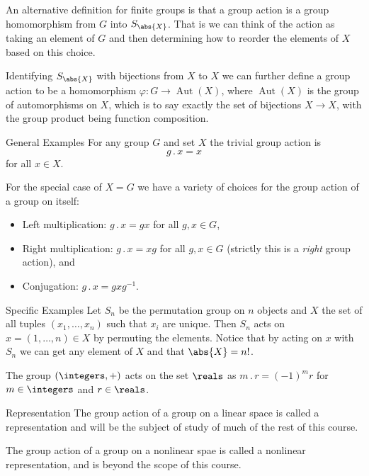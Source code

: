 \documentclass[fleqn]{NotesClass}
\newcommand*{\action}{\mathbin{.}}
\DeclareMathOperator{\Aut}{Aut}
\begin{document}
    An alternative definition for finite groups is that a group action is a group homomorphism from \(G\) into \(S_{\abs{X}}\).
    That is we can think of the action as taking an element of \(G\) and then determining how to reorder the elements of \(X\) based on this choice.
    
    Identifying \(S_{\abs{X}}\) with bijections from \(X\) to \(X\) we can further define a group action to be a homomorphism \(\varphi \colon G \to \Aut(X)\), where \(\Aut(X)\) is the group of automorphisms on \(X\), which is to say exactly the set of bijections \(X \to X\), with the group product being function composition.
    
    \begin{exm}{General Examples}{}
        For any group \(G\) and set \(X\) the trivial group action is
        \begin{equation}
            g\action x = x
        \end{equation}
        for all \(x \in X\).
        
        For the special case of \(X = G\) we have a variety of choices for the group action of a group on itself:
        \begin{itemize}
            \item Left multiplication: \(g\action x = gx\) for all \(g, x \in G\),
            \item Right multiplication: \(g\action x = xg\) for all \(g, x \in G\) (strictly this is a \emph{right} group action), and
            \item Conjugation: \(g\action x = gxg^{-1}\).
        \end{itemize}
    \end{exm}

    \begin{exm}{Specific Examples}{}
        Let \(S_n\) be the permutation group on \(n\) objects and \(X\) the set of all tuples \((x_1, \dotsc, x_n)\) such that \(x_i\) are unique.
        Then \(S_n\) acts on \(x = (1, \dotsc, n)\in X\) by permuting the elements.
        Notice that by acting on \(x\) with \(S_n\) we can get any element of \(X\) and that \(\abs{X} = n!\).
        
        The group \((\integers, +)\) acts on the set \(\reals\) as \(m\action r = (-1)^{m}r\) for \(m \in \integers\) and \(r\in \reals\).
    \end{exm}
    
    \begin{exm}{Representation}{}
        The group action of a group on a linear space is called a representation and will be the subject of study of much of the rest of this course.
        
        The group action of a group on a nonlinear spae is called a nonlinear representation, and is beyond the scope of this course.
    \end{exm}
    
\end{document}
